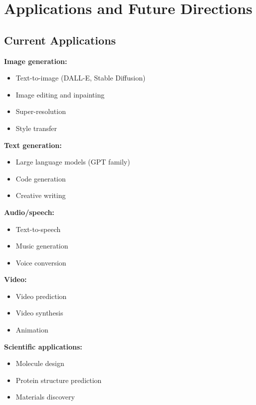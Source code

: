 
\section{Applications and Future Directions}
\label{sec:generative-applications}

\subsection{Current Applications}

\textbf{Image generation:}
\begin{itemize}
    \item Text-to-image (DALL-E, Stable Diffusion)
    \item Image editing and inpainting
    \item Super-resolution
    \item Style transfer
\end{itemize}

\textbf{Text generation:}
\begin{itemize}
    \item Large language models (GPT family)
    \item Code generation
    \item Creative writing
\end{itemize}

\textbf{Audio/speech:}
\begin{itemize}
    \item Text-to-speech
    \item Music generation
    \item Voice conversion
\end{itemize}

\textbf{Video:}
\begin{itemize}
    \item Video prediction
    \item Video synthesis
    \item Animation
\end{itemize}

\textbf{Scientific applications:}
\begin{itemize}
    \item Molecule design
    \item Protein structure prediction
    \item Materials discovery
\end{itemize}

